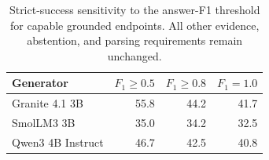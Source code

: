 \begin{table}[t]
\caption{Strict-success sensitivity to the answer-F1 threshold for capable grounded endpoints. All other evidence, abstention, and parsing requirements remain unchanged.}
\label{tab:threshold-sensitivity}
\centering
\scriptsize
\begin{tabular}{@{}lrrr@{}}
\toprule
Generator & $F_1\geq0.5$ & $F_1\geq0.8$ & $F_1=1.0$ \\
\midrule
Granite 4.1 3B & 55.8 & 44.2 & 41.7 \\
SmolLM3 3B & 35.0 & 34.2 & 32.5 \\
Qwen3 4B Instruct & 46.7 & 42.5 & 40.8 \\
\bottomrule
\end{tabular}
\end{table}
